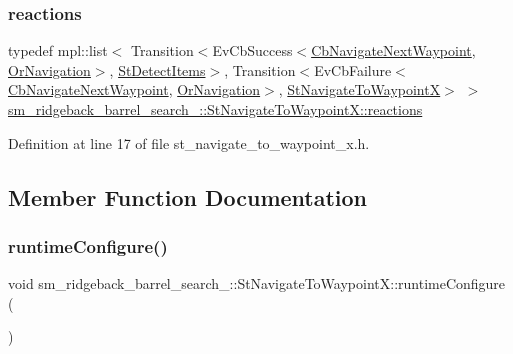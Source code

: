 \subsubsection{\texorpdfstring{reactions}{reactions}}
{\footnotesize\ttfamily typedef mpl\+::list$<$ Transition$<$Ev\+Cb\+Success$<$\hyperlink{classcl__move__base__z_1_1CbNavigateNextWaypoint}{Cb\+Navigate\+Next\+Waypoint}, \hyperlink{classsm__ridgeback__barrel__search__2_1_1OrNavigation}{Or\+Navigation}$>$, \hyperlink{structsm__ridgeback__barrel__search__2_1_1StDetectItems}{St\+Detect\+Items}$>$, Transition$<$Ev\+Cb\+Failure$<$\hyperlink{classcl__move__base__z_1_1CbNavigateNextWaypoint}{Cb\+Navigate\+Next\+Waypoint}, \hyperlink{classsm__ridgeback__barrel__search__2_1_1OrNavigation}{Or\+Navigation}$>$, \hyperlink{structsm__ridgeback__barrel__search__2_1_1StNavigateToWaypointX}{St\+Navigate\+To\+WaypointX}$>$ $>$ \hyperlink{structsm__ridgeback__barrel__search__2_1_1StNavigateToWaypointX_a86050d2412d530bb19ad0042a20235dc}{sm\+\_\+ridgeback\+\_\+barrel\+\_\+search\+\_\+::\+St\+Navigate\+To\+Waypoint\+X\+::reactions}}



Definition at line 17 of file st\+\_\+navigate\+\_\+to\+\_\+waypoint\+\_\+x.\+h.



\subsection{Member Function Documentation}
\mbox{\label{structsm__ridgeback__barrel__search__2_1_1StNavigateToWaypointX_a61fb3f74e838edc891a2768b5e6ba98d}} 
\subsubsection{\texorpdfstring{runtime\+Configure()}{runtimeConfigure()}}
{\footnotesize\ttfamily void sm\+\_\+ridgeback\+\_\+barrel\+\_\+search\+\_\+::\+St\+Navigate\+To\+Waypoint\+X\+::runtime\+Configure (\begin{DoxyParamCaption}{ }\end{DoxyParamCaption})\hspace{0.3cm}{\ttfamily [inline]}}



